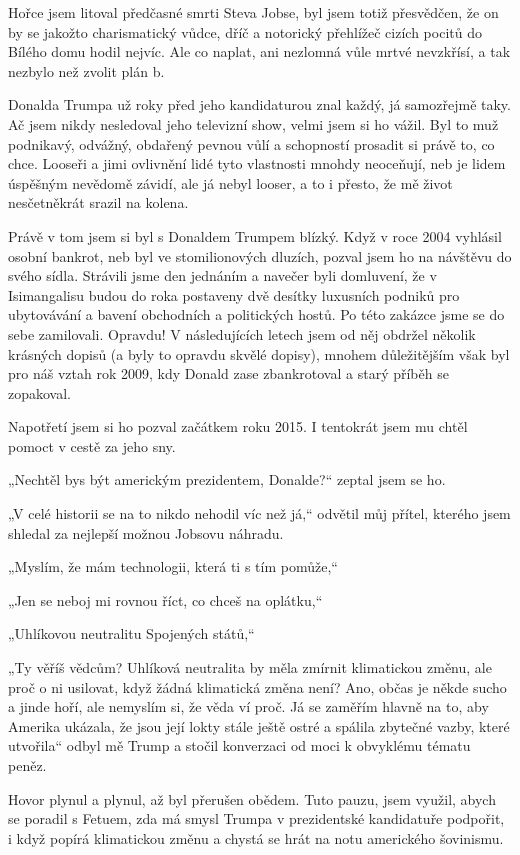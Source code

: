 Hořce jsem litoval předčasné smrti Steva Jobse, byl jsem totiž přesvědčen, že on by se jakožto charismatický vůdce, dříč a notorický přehlížeč cizích pocitů do Bílého domu hodil nejvíc. Ale co naplat, ani nezlomná vůle mrtvé nevzkřísí, a tak nezbylo než zvolit plán b.

Donalda Trumpa už roky před jeho kandidaturou znal každý, já samozřejmě taky. Ač jsem nikdy nesledoval jeho televizní show, velmi jsem si ho vážil. Byl to muž podnikavý, odvážný, obdařený pevnou vůlí a schopností prosadit si právě to, co chce. Looseři a jimi ovlivnění lidé tyto vlastnosti mnohdy neoceňují, neb je lidem úspěšným nevědomě závidí, ale já nebyl looser, a to i přesto, že mě život nesčetněkrát srazil na kolena.

Právě v tom jsem si byl s Donaldem Trumpem blízký. Když v roce 2004 vyhlásil osobní bankrot, neb byl ve stomilionových dluzích, pozval jsem ho na návštěvu do svého sídla. Strávili jsme den jednáním a navečer byli domluvení, že v Isimangalisu budou do roka postaveny dvě desítky luxusních podniků pro ubytovávání a bavení obchodních a politických hostů. Po této zakázce jsme se do sebe zamilovali. Opravdu! V následujících letech jsem od něj obdržel několik krásných dopisů (a byly to opravdu skvělé dopisy), mnohem důležitějším však byl pro náš vztah rok 2009, kdy Donald zase zbankrotoval a starý příběh se zopakoval.

Napotřetí jsem si ho pozval začátkem roku 2015. I tentokrát jsem mu chtěl pomoct v cestě za jeho sny.

„Nechtěl bys být americkým prezidentem, Donalde?“ zeptal jsem se ho.

„V celé historii se na to nikdo nehodil víc než já,“ odvětil můj přítel, kterého jsem shledal za nejlepší možnou Jobsovu náhradu.

„Myslím, že mám technologii, která ti s tím pomůže,“

„Jen se neboj mi rovnou říct, co chceš na oplátku,“

„Uhlíkovou neutralitu Spojených států,“

„Ty věříš vědcům? Uhlíková neutralita by měla zmírnit klimatickou změnu, ale proč o ni usilovat, když žádná klimatická změna není? Ano, občas je někde sucho a jinde hoří, ale nemyslím si, že věda ví proč. Já se zaměřím hlavně na to, aby Amerika ukázala, že jsou její lokty stále ještě ostré a spálila zbytečné vazby, které utvořila“ odbyl mě Trump a stočil konverzaci od moci k obvyklému tématu peněz.

Hovor plynul a plynul, až byl přerušen obědem. Tuto pauzu, jsem využil, abych se poradil s Fetuem, zda má smysl Trumpa v prezidentské kandidatuře podpořit, i když popírá klimatickou změnu a chystá se hrát na notu amerického šovinismu.

